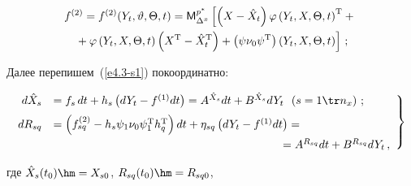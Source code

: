     

            \vspace*{-12pt}

        

        \noindent

        \begin{multline}

        f^{(2)}= f^{(2)}(Y_t,\vartheta,\Theta,t)=

    {\sf M}_{\Delta^x}^{p^*} \left[ \left(X-\hat X_t\right)\varphi\left(

    Y_t,X,\Theta,t\right)^{\mathrm{T}}+{}\right.\\

\left.{}+\varphi\left(Y_t,X,\Theta,t\right) \left(X^{\mathrm{T}}-\hat X_t^{\mathrm{T}}\right) + 

\left(\psi\nu_0\psi^{\mathrm{T}}\right) \left(Y_t,X,\Theta,t\right)\right]\,;

\label{e48a}

\end{multline}



Далее перепишем~(\ref{e4.3-s1}) покоординатно:

 \begin{equation}

 \hspace*{-2mm}\left.

 \begin{array}{rl}

 d\hat X_s &= f_s\, dt + h_s \left(dY_t- f^{(1)} dt\right) = 

 A^{\hat X_s} dt + B^{\hat X_s} dY_t\enskip \left(s=1\tr

    n_x\right)\,;\\[6pt]

   dR_{sq} &=\left(f_{sq}^{(2)} - h_s\psi_1\nu_0\psi_1^{\mathrm{T}}

    h_q^{\mathrm{T}} \right) dt +\eta_{sq} \left(dY_t - f^{(1)} dt\right)={}\\[6pt]

&   \hspace*{70mm}{}= A^{R_{sq}} dt + B^{R_{sq}} dY_t\,, %

    \end{array}

    \right\}\!

    \label{e4.6-s1}

    \end{equation}

где $\hat X_s (t_0) \hm= X_{s0}$, $R_{sq} (t_0) \hm= R_{sq0}$,  

